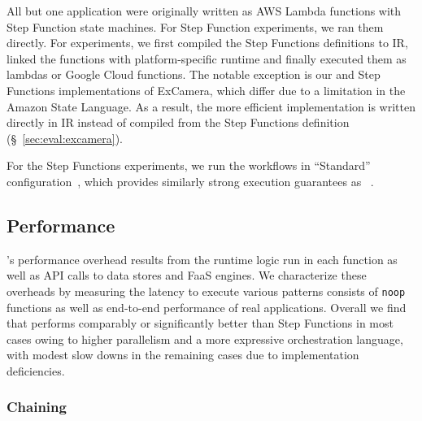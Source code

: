 All but one application were originally written as AWS Lambda functions with
Step Function state machines. For Step Function experiments, we ran them
directly. For \name{} experiments, we first compiled the Step Functions
definitions to \name{} IR, linked the functions with platform-specific runtime
and finally executed them as lambdas or Google Cloud functions. The notable
exception is our \name{} and Step Functions implementations of ExCamera, which
differ due to a limitation in the Amazon State Language. As a result, the more
efficient \name{} implementation is written directly in \name{} IR instead of
compiled from the Step Functions definition (\S~\ref{sec:eval:excamera}).

For the Step Functions experiments, we run the workflows in ``Standard''
configuration~\cite{aws-step-functions-standard-vs-express}, which provides
similarly strong execution guarantees as
\name{}~\cite{aws-step-functions-exec-gntee}.

\subsection{Performance}\label{sec:eval:micro}

\name{}'s performance overhead results from the \name{} runtime logic run in
each function as well as API calls to data stores and FaaS engines. We
characterize these overheads by measuring the latency to execute various
patterns consists of \texttt{noop} functions as well as end-to-end performance
of real applications. Overall we find that \name{} performs comparably or
significantly better than Step Functions in most cases owing to higher
parallelism and a more expressive orchestration language, with modest slow
downs in the remaining cases due to implementation deficiencies.

\subsubsection{Chaining}\label{sec:eval:chain}

